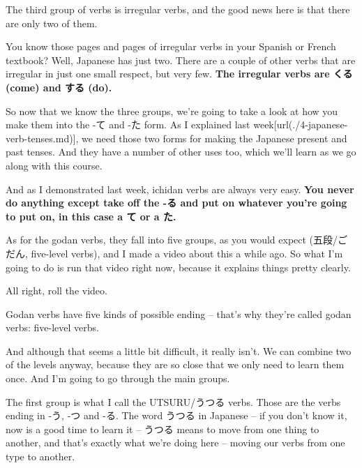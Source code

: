 \stopsectionlevel

\startsectionlevel[title={Irregular verbs},reference={irregular-verbs}]

The third group of verbs is irregular verbs, and the good news here is that there are only two of them.

{}

You know those pages and pages of irregular verbs in your Spanish or French textbook? Well, Japanese has just two. There are a couple of other verbs that are irregular in just one small respect, but very few. {\bf The irregular verbs are くる (come) and する (do).}

\stopsectionlevel

\startsectionlevel[title={The -て Form},reference={the--て-form}]

So now that we know the three groups, we're going to take a look at how you make them into the -て and -た form. As I explained last week\goto{{[}4{]}}[url(./4-japanese-verb-tenses.md)], we need those two forms for making the Japanese present and past tenses. And they have a number of other uses too, which we'll learn as we go along with this course.

And as I demonstrated last week, ichidan verbs are always very easy. {\bf You never do anything except take off the -る and put on whatever you're going to put on, in this case a て or a た.}

As for the godan verbs, they fall into five groups, as you would expect (五段/ごだん, five-level verbs), and I made a video about this a while ago. So what I'm going to do is run that video right now, because it explains things pretty clearly.

All right, roll the video.

Godan verbs have five kinds of possible ending -- that's why they're called godan verbs: five-level verbs.

{}

And although that seems a little bit difficult, it really isn't. We can combine two of the levels anyway, because they are so close that we only need to learn them once. And I'm going to go through the main groups.

\startsectionlevel[title={The First Godan Group},reference={the-first-godan-group}]

The first group is what I call the UTSURU/うつる verbs. Those are the verbs ending in -う, -つ and -る. The word うつる in Japanese -- if you don't know it, now is a good time to learn it -- うつる means to move from one thing to another, and that's exactly what we're doing here -- moving our verbs from one type to another.


